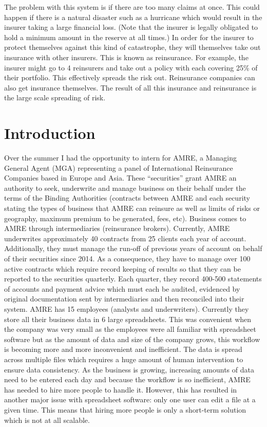 \documentclass[12pt]{article}
\begin{document}
The problem with this system is if there are too many claims at once. This could happen if there is a natural disaster such as a hurricane which would result in the insurer taking a large financial loss. (Note that the insurer is legally obligated to hold a minimum amount in the reserve at all times.) In order for the insurer to protect themselves against this kind of catastrophe, they will themselves take out insurance with other insurers. This is known as reinsurance. For example, the insurer might go to 4 reinsurers and take out a policy with each covering 25\% of their portfolio. This effectively spreads the risk out. Reinsurance companies can also get insurance themselves. The result of all this insurance and reinsurance is the large scale spreading of risk.



\section{Introduction}
Over the summer I had the opportunity to intern for AMRE, a Managing General Agent (MGA)
representing a panel of International Reinsurance Companies based in Europe and Asia. These
“securities” grant AMRE an authority to seek, underwrite and manage business on their behalf under
the terms of the Binding Authorities (contracts between AMRE and each security stating the types of
business that AMRE can reinsure as well as limits of risks or geography, maximum premium to be
generated, fees, etc). Business comes to AMRE through intermediaries (reinsurance brokers).
Currently, AMRE underwrites approximately 40 contracts from 25 clients each year of account.
Additionally, they must manage the run-off of previous years of account on behalf of their securities
since 2014. As a consequence, they have to manage over 100 active contracts which require record
keeping of results so that they can be reported to the securities quarterly. Each quarter, they record
400-500 statements of accounts and payment advice which must each be audited, evidenced by
original documentation sent by intermediaries and then reconciled into their system. AMRE has 15
employees (analysts and underwriters).
Currently they store all their business data in 6 large spreadsheets. This was convenient when the
company was very small as the employees were all familiar with spreadsheet software but as the
amount of data and size of the company grows, this workflow is becoming more and more
inconvenient and inefficient.
The data is spread across multiple files which requires a huge amount of human intervention to
ensure data consistency. As the business is growing, increasing amounts of data need to be entered
each day and because the workflow is so inefficient, AMRE has needed to hire more people to
handle it. However, this has resulted in another major issue with spreadsheet software: only one
user can edit a file at a given time. This means that hiring more people is only a short-term solution
which is not at all scalable.
\end{document}
